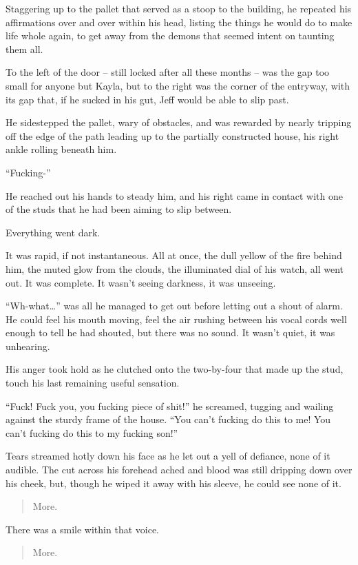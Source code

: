 Staggering up to the pallet that served as a stoop to the building, he repeated his affirmations over and over within his head, listing the things he would do to make life whole again, to get away from the demons that seemed intent on taunting them all.

To the left of the door -- still locked after all these months -- was the gap too small for anyone but Kayla, but to the right was the corner of the entryway, with its gap that, if he sucked in his gut, Jeff would be able to slip past.

He sidestepped the pallet, wary of obstacles, and was rewarded by nearly tripping off the edge of the path leading up to the partially constructed house, his right ankle rolling beneath him.

``Fucking-''

He reached out his hands to steady him, and his right came in contact with one of the studs that he had been aiming to slip between.

Everything went dark.

It was rapid, if not instantaneous.  All at once, the dull yellow of the fire behind him, the muted glow from the clouds, the illuminated dial of his watch, all went out.  It was complete.  It wasn't seeing darkness, it was unseeing.

``Wh-what\ldots{}'' was all he managed to get out before letting out a shout of alarm.  He could feel his mouth moving, feel the air rushing between his vocal cords well enough to tell he had shouted, but there was no sound.  It wasn't quiet, it was unhearing.

His anger took hold as he clutched onto the two-by-four that made up the stud, touch his last remaining useful sensation.

``Fuck!  Fuck you, you fucking piece of shit!'' he screamed, tugging and wailing against the sturdy frame of the house.  ``You can't fucking do this to me!  You can't fucking do this to my fucking son!''

Tears streamed hotly down his face as he let out a yell of defiance, none of it audible.  The cut across his forehead ached and blood was still dripping down over his cheek, but, though he wiped it away with his sleeve, he could see none of it.

\begin{quote}
  More.
\end{quote}

There was a smile within that voice.

\begin{quote}
  More.
\end{quote}
